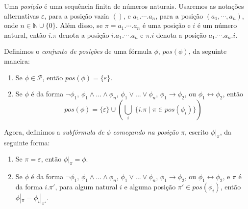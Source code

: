 \begin{definition}
	Uma \emph{posição} é uma sequência finita de números naturais. Usaremos as notações alternativas $\varepsilon$, para a posição vazia $()$, e $a_1.\cdots.a_n$, para a posição $(a_1,\cdots,a_n)$, onde $n \in \mathbb{N} \cup \{0\}$. Além disso, se $\pi = a_1.\cdots.a_n$ é uma posição e $i$ é um número natural, então $i.\pi$ denota a posição $i.a_1.\cdots.a_n$ e $\pi.i$ denota a posição $a_1.\cdots.a_n.i$.
	
    Definimos o \emph{conjunto de posições} de uma fórmula $\phi$, $pos(\phi)$, da seguinte maneira:
    \begin{enumerate}
        \item Se $\phi \in \mathcal{P}$, então $pos(\phi) = \{\varepsilon\}$.
        \item Se $\phi$ é da forma $\neg \phi_1$, $\phi_1 \wedge ... \wedge \phi_n$, $\phi_1 \vee ... \vee \phi_n$, $\phi_1 \rightarrow \phi_2$, ou $\phi_1 \leftrightarrow \phi_2$, então $$pos(\phi) = \{\varepsilon\} \cup \left(\bigcup_i \; \{i.\pi \mid \pi \in pos(\phi_i)\}\right)$$
    \end{enumerate}
    
    Agora, definimos a \emph{subfórmula de} $\phi$ \emph{começando na posição} $\pi$, escrito $\phi|_\pi$, da seguinte forma:
    \begin{enumerate}
        \item Se $\pi = \varepsilon$, então $\phi|_\pi = \phi$.
        \item Se $\phi$ é da forma $\neg \phi_1$, $\phi_1 \wedge ... \wedge \phi_n$, $\phi_1 \vee ... \vee \phi_n$, $\phi_1 \rightarrow \phi_2$, ou $\phi_1 \leftrightarrow \phi_2$, e $\pi$ é da forma $i.\pi'$, para algum natural $i$ e alguma posição $\pi' \in pos(\phi_i)$, então $\phi|_\pi = \phi_i|_{\pi'}$.
    \end{enumerate}
\end{definition}

